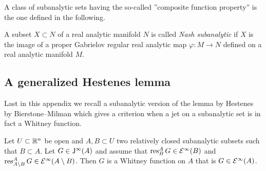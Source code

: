 A class of subanalytic sets having the so-called ''composite function property'' \cite{BieMilCDF,BieMilPawCDF} 
is the one defined in the following. 

\begin{definition} 
\label{Def:NashSubanalytic}
  A subset $X\subset N$ of a real analytic manifold $N$ is called \emph{Nash subanalytic} if $X$ is 
  the image of a proper Gabrielov regular real analytic map $\varphi : M \to N$ defined on a 
  real analytic manifold $M$.  
\end{definition}


\subsection{A generalized Hestenes lemma}
\label{sec:subanalytic-hestenes-lemma}

Last in this appendix we recall a subanalytic version of the lemma by Hestenes by 
Bierstone--Milman \cite{BieMilCDF,BieMilGDPSS} which gives a criterion when a
jet on a subanalytic set is in fact a Whitney function. 

\begin{lemma}
\label{Lem:subanalytic-hestenes-lemma}
Let $U \subset \mathbb{R}^n$ be open and $A,B  \subset U$ two relatively closed subanalytic subsets such that $B\subset A$. 
Let $G \in \mathsf{J}^\infty (A)$ and assume that $\operatorname{res}^A_{B} G \in \mathcal{E}^\infty (B)$ and
$\operatorname{res}^A_{A\setminus B} G \in \mathcal{E}^\infty (A\setminus B)$. Then $G$ is a Whitney function
on $A$ that is $G \in \mathcal{E}^\infty (A)$.
\end{lemma}


